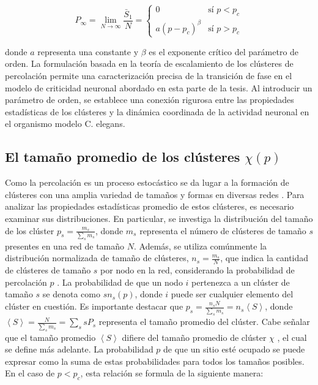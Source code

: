 \begin{equation}\label{eq:5}
	P_\infty = \lim_{N\to\infty} \frac{\bar{S}_1}{N} =  \begin{cases}
		0 & \text{sí } p<p_c\\
		a\left(p-p_c\right)^\beta & \text{sí } p>p_c
	\end{cases}
\end{equation}

donde $a$ representa una constante y $\beta$ es el exponente crítico del parámetro de orden. La formulación basada en la teoría de escalamiento de los clústeres de percolación permite una caracterización precisa de la transición de fase en el modelo de criticidad neuronal abordado en esta parte de la tesis. Al introducir un parámetro de orden, se establece una conexión rigurosa entre las propiedades estadísticas de los clústeres y la dinámica coordinada de la actividad neuronal en el organismo modelo C. elegans. 


\subsection{ El tamaño promedio de los clústeres  $ \chi(p)$}\label{sec:Sucebtibilidad}

Como la percolación es un proceso estocástico se da lugar a la formación de clústeres con una amplia variedad de tamaños y formas en diversas redes \cite{aharony_introduction_2017}. Para analizar las propiedades estadísticas promedio de estos clústeres, es necesario examinar sus distribuciones. En particular, se investiga la distribución del tamaño de los clúster  \( p_s=\frac{m_s}{\sum_{s}m_s} \), donde $m_s$ representa el número de clústeres de tamaño $s$ presentes en una red de tamaño $N$. Además, se utiliza comúnmente la distribución normalizada de tamaño de clústeres, \(n_s=\frac{m_s}{N}\), que indica la cantidad de clústeres de tamaño $s$ por nodo en la red, considerando la probabilidad de percolación $p$ \cite{barrat_dynamical_2008}. La probabilidad de que un nodo $i$ pertenezca a un clúster de tamaño $s$ se denota como $sn_s(p)$, donde $i$ puede ser cualquier elemento del clúster en cuestión. Es importante destacar que \(p_s=\frac{n_sN}{\sum_{s}m_s}=n_s\left\langle S \right\rangle \), donde \(\left\langle S \right\rangle =\frac{N}{\sum_{s}m_s} = \sum_{s} sP_s \) representa el tamaño promedio del clúster. Cabe señalar que el tamaño promedio \(\left\langle  S \right\rangle \)   difiere del tamaño promedio de clúster \(\chi\) , el cual se define más adelante. La probabilidad $p$ de que un sitio esté ocupado se puede expresar como la suma de estas probabilidades para todos los tamaños posibles. En el caso de $p < p_c$, esta relación se formula de la siguiente manera:

